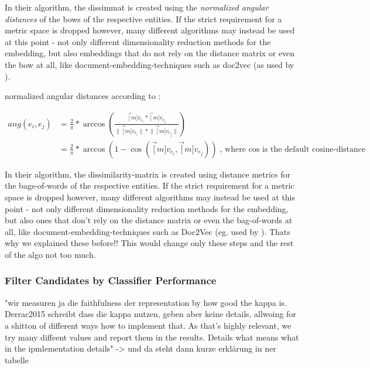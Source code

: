 In their algorithm, the \gls{dissimmat} is created using the \emph{normalized angular distances} of the \glspl{bow} of the respective entities. If the strict requirement for a metric space is dropped however, many different algorithms may instead be used at this point - not only different dimensionality reduction methods for the embedding, but also embeddings that do not rely on the distance matrix or even the \gls{bow} at all, like document-embedding-techniques such as \gls{doc2vec} \cite{Le2014} (as \eg used by \cite{Alshaikh2020}).


normalized angular distances according to \cite{Derrac2015}:

\begin{align}
	ang(e_i, e_j) &= \frac{2}{\pi} * \arccos \left( \frac{\vec[m]{v_{e_i}} * \vec[m]{v_{e_j}}} { \lVert \vec[m]{v_{e_i}} \rVert * \lVert \vec[m]{v_{e_j}} \rVert }  \right)  \label{eq:norm_ang_dist} \\
	&= \frac{2}{\pi} * \arccos(1-\cos(\vec[m]{v_{e_i}},\vec[m]{v_{e_j}})) \text{, where $\cos$ is the default cosine-distance} \nonumber
\end{align}


In their algorithm, the dissimilarity-matrix is created using distance metrics for the bags-of-words of the respective entities. If the strict requirement for a metric space is dropped however, many different algorithms may instead be used at this point - not only different dimensionality reduction methods for the embedding, but also ones that don't rely on the distance matrix or even the bag-of-words at all, like document-embedding-techniques such as Doc2Vec (eg. used by \cite{which_one??}). Thats why we explained these before!! This would change only these steps and the rest of the algo not too much.




\subsubsection{Filter Candidates by Classifier Performance}

\label{sec:svm_filter_cands}

 "wir measuren ja die faithfulness der representation by how good the kappa is. Derrac2015 schreibt dass die kappa nutzen, geben aber keine details, allwoing for a shitton of different ways how to implement that. As that's highly relevant, we try many diffeent values and report them in the results. Details what means what in the ipmlementation details" -> und da steht dann kurze erklärung in ner tabelle


